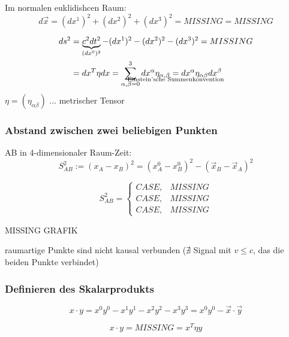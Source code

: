 \documentclass[a4paper, 11pt]{article}
\numberwithin{equation}{section}
\begin{document}
Im normalen euklidishcen Raum:
\begin{equation}
d \vec{x} = (dx^1)^2 +(dx^2)^2 + (dx^3)^2 = MISSING = MISSING
\end{equation}

\begin{equation}
\begin{aligned}
ds^2 &= \underbrace{c^2dt^2}_{(dx^0)^2} - (dx^1)^2 - (dx^2)^2 - (dx^3)^2 = MISSING \\
&= dx^T\eta dx = \sum^3_{\alpha,\beta = 0} dx^\alpha \eta_{\alpha, \beta} \underset{\mathclap{\text{Einstein'sche Summenkonvention}}}{=} dx^\alpha \eta_{\alpha \beta} dx^\beta
\end{aligned}
\end{equation}
$\eta = (\eta_{\alpha \beta})$ ... metrischer Tensor


\subsubsection*{Abstand zwischen zwei beliebigen Punkten}
AB in 4-dimensionaler Raum-Zeit:
\begin{equation}
S^2_{AB} := (x_A- x_B)^2 = \left(x^0_A -x^0_B\right)^2 - \left(\vec{x}_B - \vec{x}_A\right)^2
\end{equation}

\begin{equation}
S^2_{AB} = \begin{cases}
CASE, & MISSING \\
CASE, & MISSING \\
CASE, & MISSING
\end{cases}
\end{equation}

MISSING GRAFIK

raumartige Punkte sind nicht kausal verbunden ($\nexists$ Signal mit $v \leq c$, das die beiden Punkte verbindet) 


\subsubsection*{Definieren des Skalarprodukts}

\begin{equation}
x \cdot y = x^0y^0 - x^1y^1-x^2y^2-x^3y^3 = x^0y^0- \vec{x} \cdot \vec{y}
\end{equation}

\begin{equation}
x \cdot y = MISSING= x^T \eta y
\end{equation}
\end{document}
